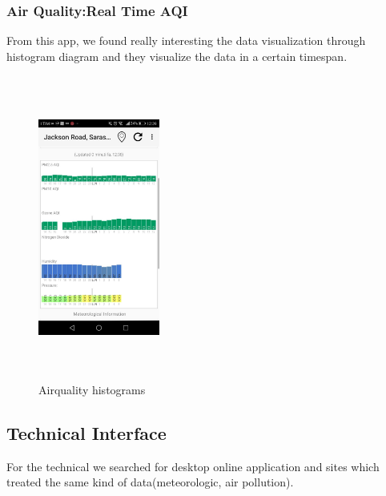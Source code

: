 \documentclass[12pt]{article} %
\begin{document}
\begin{itemize}
\subsubsection{Air Quality:Real Time AQI}
From this app, we found really interesting the data visualization through histogram diagram and they visualize the data in a certain timespan.
\begin{figure}[H]
  \centering
  \includegraphics[width=4cm,height=10cm,keepaspectratio]{img/apphistogram.jpeg}
  \caption{Airquality histograms}
  \label{fig:boat3}
\end{figure}

\subsection{Technical Interface}
For the technical we searched for desktop online application and sites which treated the same kind of data(meteorologic, air pollution).


\end{itemize}
\end{document}
